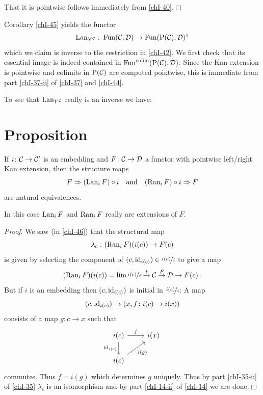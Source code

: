         That it is pointwise follows immediately from \ref{chI-40}.\hfill$\Box$

        Corollary \ref{chI-45} yields the functor
        \begin{equation*}
            \Lan_{Y^{\Cc}} \,\colon \Fun(\Cc, \Dd) \rightarrow \Fun(\mathrm{P}(\Cc), \Dd)\footnotemark
        \end{equation*}
        which we claim is inverse to the restriction in \ref{chI-42}. We first check that its essential image is indeed contained in $\operatorname{Fun}^{\operatorname*{colim}}(\mathrm{P}(\mathcal{C}), \mathcal{D})$: Since the Kan extension is pointwise and colimits in $\mathrm{P}(\mathcal{C})$ are computed pointwise, this is immediate from part \ref{chI-37-ii} of \ref{chI-37} and \ref{chI-44}.

        To see that $\operatorname{Lan}_{Y^{\mathcal{C}}}$ really is an inverse we have:
    \section{Proposition}\label{chI-47}
        If $i \colon \mathcal{C} \to \mathcal{C}'$ is an embedding and $F \colon \mathcal{C} \to \mathcal{D}$ a functor with pointwise left/right Kan extension, then the structure maps
        \begin{equation*}
            F \Rightarrow (\operatorname{Lan}_i F) \circ i \quad \text{and} \quad (\operatorname{Ran}_i F) \circ i \Rightarrow F
        \end{equation*}
        are natural equivalences. 
        
        In this case $\operatorname{Lan}_i F$ and $\operatorname{Ran}_i F$ really are extensions of $F$.
        \smallskip

        \emph{Proof}. We saw (in \ref{chI-46}) that the structural map
        \begin{equation*}
            \lambda_c \,\colon (\operatorname{Ran}_i F) (i(c)) \to F(c)
        \end{equation*}
        is given by selecting the component of $(c, \operatorname{id}_{i(c)}) \in \nicefrac{i(c)}{i}$ to give a map
        \begin{equation*}
            (\operatorname{Ran}_i F)(i(c)) = \lim \nicefrac{i(c)}{i} \overset{t}{\rightarrow} \mathcal{C} \overset{F}{\rightarrow} \mathcal{D} \to F(c) \,.
        \end{equation*}
        But if $i$ is an embedding then $(c, \operatorname{id}_{i(c)})$ is initial in $\nicefrac{i(c)}{i}$: A map
        \begin{equation*}
            (c, \operatorname{id}_{i(c)}) \to (x, f \colon i(c) \to i(x))
        \end{equation*}
        consists of a map $g \colon c \to x$ such that
        \begin{equation*}
            \begin{tikzcd}
                i(c) \arrow[d, "\id_{i(c)}"'] \arrow[r, "f"] & i(x) \\
                i(c) \arrow[ru, "i(g)"']                     &     
            \end{tikzcd}
        \end{equation*}
        commutes. Thus $f = i(g)$ which determines $g$ uniquely. Thus by part \ref{chI-35-ii} of \ref{chI-35} $\lambda_c$ is an isomorphism and by part \ref{chI-14-ii} of \ref{chI-14} we are done.\hfill$\Box$

